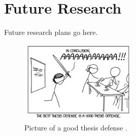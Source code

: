 \section{Future Research}

Future research plans go here.

\begin{figure}[t]
    \centering
    \includegraphics[width=0.5\textwidth]{./figures/Thesis_Defense.png}
    \caption
    {Picture of a good thesis defense \cite{MunroeXKCD}.
    \label{fig:thesis_defense}}
\end{figure}



